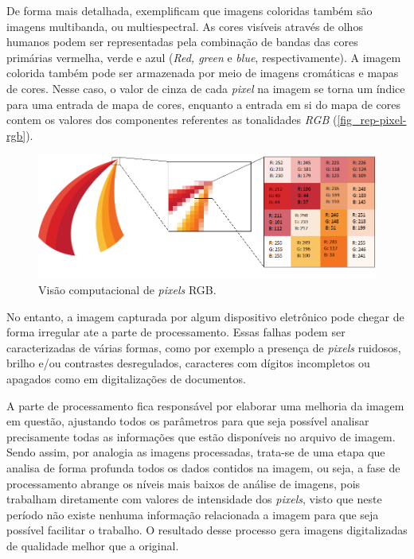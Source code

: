 De forma mais detalhada,  exemplificam que imagens coloridas também são imagens multibanda, ou multiespectral. As cores visíveis através de olhos humanos podem ser representadas pela combinação de bandas das cores primárias vermelha, verde e azul (\textit{Red, green} e \textit{blue}, respectivamente). A imagem colorida também pode ser armazenada por meio de imagens cromáticas e mapas de cores. Nesse caso, o valor de cinza de cada \textit{pixel} na imagem se torna um índice para uma entrada de mapa de cores, enquanto a entrada em si do mapa de cores contem os valores dos componentes referentes as tonalidades \textit{RGB} (\autoref{fig_rep-pixel-rgb}).

\begin{figure}[h]
	\caption{\label{fig_rep-pixel-rgb}Visão computacional de \textit{pixels} RGB.}
	\begin{center}
		\includegraphics[scale=0.4]{4-Conteudo-Bibliografico/2-Visao-Computacional/Imagens-Visao-Computacional/rep-pixel-rgb.png}
	\end{center}
	\centering {}
\end{figure}

No entanto, a imagem capturada por algum dispositivo eletrônico pode chegar de forma irregular ate a parte de processamento. Essas falhas podem ser caracterizadas de várias formas, como por exemplo a presença de \textit{pixels} ruidosos, brilho e/ou contrastes desregulados, caracteres com dígitos incompletos ou apagados como em digitalizações de documentos.

A parte de processamento fica responsável por elaborar uma melhoria da imagem em questão, ajustando todos os parâmetros para que seja possível analisar precisamente todas as informações que estão disponíveis no arquivo de imagem. Sendo assim, por analogia as imagens processadas, trata-se de uma etapa que analisa de forma profunda todos os dados contidos na imagem, ou seja, a fase de processamento abrange os níveis mais baixos de análise de imagens, pois trabalham diretamente com valores de intensidade dos \textit{pixels}, visto que neste período não existe nenhuma informação relacionada a imagem para que seja possível facilitar o trabalho. O resultado desse processo gera imagens digitalizadas de qualidade melhor que a original.